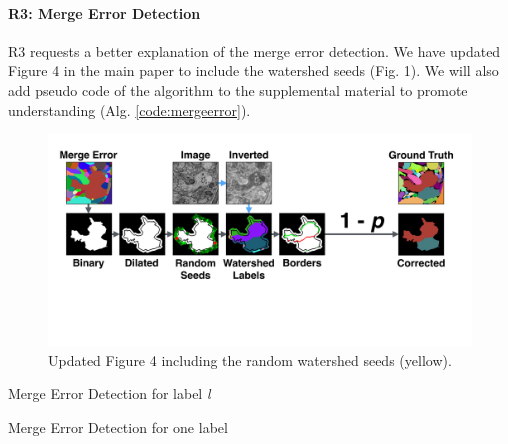 \documentclass[10pt,twocolumn,letterpaper]{article}
\begin{document}
\paragraph{R3: Merge Error Detection}
R3 requests a better explanation of the merge error detection. We have updated Figure 4 in the main paper to include the watershed seeds (Fig. 1). We will also add pseudo code of the algorithm to the supplemental material to promote understanding (Alg. \ref{code:mergeerror}).

\begin{figure}[h]
\centering
\includegraphics[width=\linewidth]{gfx/merge_error_v6.pdf}
\caption{Updated Figure 4 including the random watershed seeds (yellow).}
\label{fig:merge_error}
\end{figure}

\begin{algorithm}
\caption{Merge Error Detection for label \emph{l}}\label{code:mergeerror}
\begin{algorithmic}[1]

\end{algorithmic}
\end{algorithm}

\begin{algorithm}
\caption{Merge Error Detection for one label}\label{code:mergeerror2}
\begin{algorithmic}[1]
	\EndFor

\end{algorithmic}
\end{algorithm}
\end{document}
